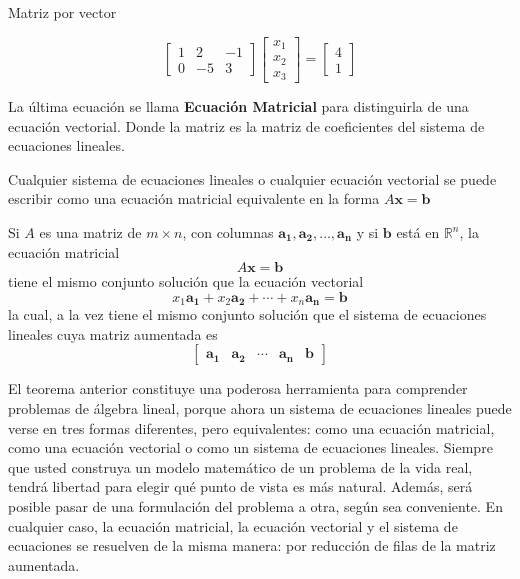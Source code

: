 \documentclass{article}
\begin{document}
Matriz por vector

\begin{equation*}
    \begin{bmatrix}
        1 & 2 & -1\\
        0 & -5 & 3
    \end{bmatrix}
    \begin{bmatrix} x_1\\x_2\\x_3 \end{bmatrix}
    =\begin{bmatrix} 4\\1 \end{bmatrix}
\end{equation*}

La última ecuación se llama \textbf{Ecuación Matricial} para distinguirla de una ecuación vectorial. Donde la matriz es la matriz de coeficientes del sistema de ecuaciones lineales. 

Cualquier sistema de ecuaciones lineales o cualquier ecuación vectorial se puede escribir como una ecuación matricial equivalente en la forma $A\mathbf{x} = \mathbf{b}$

\begin{tcolorbox}[colback=blue!10!white,colframe=blue!60!black,title=Ecuación Matricial]
    Si $A$ es una matriz de $m \times n$, con columnas $\mathbf{a_1},\mathbf{a_2},\dots, \mathbf{a_n}$ y si $\mathbf{b}$ está en $\mathbb{R}^n$, la ecuación matricial $$A\mathbf{x} = \mathbf{b}$$ tiene el mismo conjunto solución que la ecuación vectorial $$x_1\mathbf{a_1} + x_2\mathbf{a_2} + \dotsb + x_n\mathbf{a_n} = \mathbf{b}$$ la cual, a la vez tiene el mismo conjunto solución que el sistema de ecuaciones lineales cuya matriz aumentada es $$\begin{bmatrix}\mathbf{a_1}&\mathbf{a_2}& \dotsb & \mathbf{a_n} & \mathbf{b}\end{bmatrix}$$
\end{tcolorbox}

El teorema anterior constituye una poderosa herramienta para comprender problemas de álgebra lineal, porque ahora un sistema de ecuaciones lineales puede verse en tres formas diferentes, pero equivalentes: como una ecuación matricial, como una ecuación vectorial o como un sistema de ecuaciones lineales. Siempre que usted construya un modelo matemático de un problema de la vida real, tendrá libertad para elegir qué punto de vista es más natural. Además, será posible pasar de una formulación del problema a otra, según sea conveniente. En cualquier caso, la ecuación matricial, la ecuación vectorial y el sistema de ecuaciones se resuelven de la misma manera: por reducción de filas de la matriz aumentada. 
\end{document}
